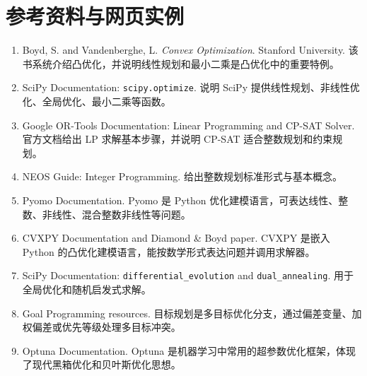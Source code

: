 \documentclass[11pt,a4paper]{ctexart}
\begin{document}
\section{参考资料与网页实例}
\begin{enumerate}
\item Boyd, S. and Vandenberghe, L. \textit{Convex Optimization}. Stanford University. 该书系统介绍凸优化，并说明线性规划和最小二乘是凸优化中的重要特例。
\item SciPy Documentation: \texttt{scipy.optimize}. 说明 SciPy 提供线性规划、非线性优化、全局优化、最小二乘等函数。
\item Google OR-Tools Documentation: Linear Programming and CP-SAT Solver. 官方文档给出 LP 求解基本步骤，并说明 CP-SAT 适合整数规划和约束规划。
\item NEOS Guide: Integer Programming. 给出整数规划标准形式与基本概念。
\item Pyomo Documentation. Pyomo 是 Python 优化建模语言，可表达线性、整数、非线性、混合整数非线性等问题。
\item CVXPY Documentation and Diamond \& Boyd paper. CVXPY 是嵌入 Python 的凸优化建模语言，能按数学形式表达问题并调用求解器。
\item SciPy Documentation: \texttt{differential\_evolution} and \texttt{dual\_annealing}. 用于全局优化和随机启发式求解。
\item Goal Programming resources. 目标规划是多目标优化分支，通过偏差变量、加权偏差或优先等级处理多目标冲突。
\item Optuna Documentation. Optuna 是机器学习中常用的超参数优化框架，体现了现代黑箱优化和贝叶斯优化思想。
\end{enumerate}
\end{document}
